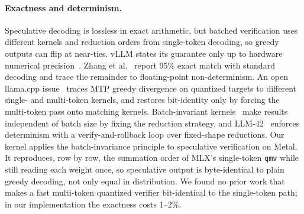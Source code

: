 \paragraph{Exactness and determinism.}
Speculative decoding is lossless in exact arithmetic, but batched verification uses different kernels and reduction orders from single-token decoding, so greedy outputs can flip at near-ties.
vLLM states its guarantee only up to hardware numerical precision~\cite{vllm2026specdecode}.
Zhang et al.~\cite{zhang2026correctness} report 95\% exact match with standard decoding and trace the remainder to floating-point non-determinism.
An open llama.cpp issue~\cite{ankk2026issue25618} traces MTP greedy divergence on quantized targets to different single- and multi-token kernels, and restores bit-identity only by forcing the multi-token pass onto matching kernels.
Batch-invariant kernels~\cite{he2025nondeterminism,vllm2026batchinvariance} make results independent of batch size by fixing the reduction strategy, and LLM-42~\cite{gond2026llm42} enforces determinism with a verify-and-rollback loop over fixed-shape reductions.
Our kernel applies the batch-invariance principle to speculative verification on Metal.
It reproduces, row by row, the summation order of MLX's single-token \texttt{qmv} while still reading each weight once, so speculative output is byte-identical to plain greedy decoding, not only equal in distribution.
We found no prior work that makes a fast multi-token quantized verifier bit-identical to the single-token path; in our implementation the exactness costs 1--2\%.
